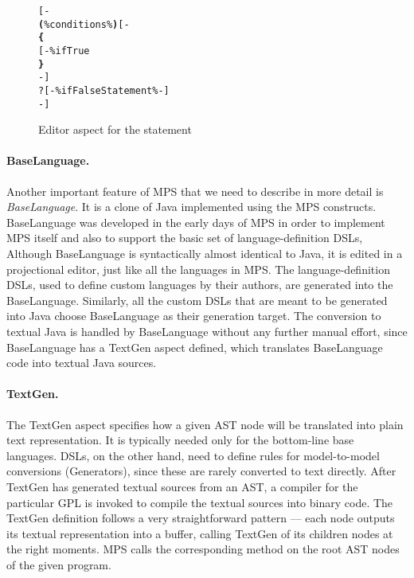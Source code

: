 \begin{figure}[ht]
\centering
\begin{alltt}
\small
{}  
    [-
       \textbf{(} \% conditions \% \textbf{)} [-
      \textbf{\{}
      [- \% ifTrue % -]
      \textbf{\}}
    -]
    ?[-  \% ifFalseStatement \% -]
    -]
\end{alltt}
\caption{Editor aspect for the  statement}
\label{fig:if_editor_definition}
\end{figure}

\paragraph{BaseLanguage.}
Another important feature of MPS that we need to describe in more detail is \emph{BaseLanguage}.
It is a clone of Java implemented using the MPS constructs.
BaseLanguage was developed in the early days of MPS in order to implement MPS itself and also to support the basic set of language-definition DSLs,
Although BaseLanguage is syntactically almost identical to Java, it is edited in a projectional editor, just like all the languages in MPS.
The language-definition DSLs, used to define custom languages by their authors, are generated into the BaseLanguage.
Similarly, all the custom DSLs that are meant to be generated into Java choose BaseLanguage as their generation target.
The conversion to textual Java is handled by BaseLanguage without any further manual effort, since BaseLanguage has a TextGen aspect defined, which translates BaseLanguage code into textual Java sources.

\paragraph{TextGen.}
The TextGen aspect specifies how a given AST node will be translated into plain text representation.
It is typically needed only for the bottom-line base languages.
DSLs, on the other hand, need to define rules for model-to-model conversions (Generators), since these are rarely converted to text directly.
After TextGen has generated textual sources from an AST, a compiler for the particular GPL is invoked to compile the textual sources into binary code.
The TextGen definition follows a very straightforward pattern --- each node outputs its textual representation into a buffer, calling TextGen of its children nodes at the right moments.
MPS calls the corresponding method on the root AST nodes of the given program.

